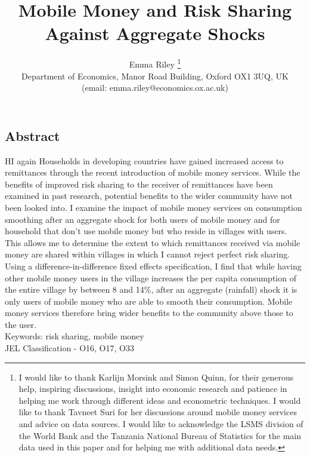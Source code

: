 \documentclass[a4paper]{article}
\begin{document}
\begin{titlepage}
\title{Mobile Money and Risk Sharing Against Aggregate Shocks}
\author{Emma Riley \footnote{I would like to thank  Karlijn Morsink and Simon Quinn, for their generous help, inspiring discussions, insight into economic research and patience in helping me work through different ideas and econometric techniques. I would like to thank Tavneet Suri for her discussions around mobile money services and advice on data sources. I would like to acknowledge the LSMS division of the World Bank and the Tanzania National Bureau of Statistics for the main data used in this paper and for helping me with additional data needs.} \\ Department of Economics, Manor Road Building, Oxford OX1 3UQ, UK \\ (email: emma.riley@economics.ox.ac.uk)}
\thispagestyle{empty}
\maketitle 
\begin{center}
\section*{Abstract}
\end{center}
HI again
Households in developing countries have gained increased access to remittances through the recent introduction of mobile money services. While the benefits of improved risk sharing to the receiver of remittances have been examined in past research, potential benefits to the wider community have not been looked into. I examine the impact of mobile money services on consumption smoothing after an aggregate shock for both users of mobile money and for household that don't use mobile money but who reside in villages with users. This allows me to determine the extent to which remittances received via mobile money are shared within villages in which I cannot reject perfect risk sharing. Using a difference-in-difference fixed effects specification, I find that while having other mobile money users in the village increases the per capita consumption of the entire village by between  8 and 14\%, after an aggregate (rainfall) shock it is only users of mobile money who are able to smooth their consumption. Mobile money services therefore bring wider benefits to the community above those to the user. \\

\noindent Keywords: risk sharing, mobile money \\
JEL Classification - O16, O17, O33
\thispagestyle{empty}



\end{titlepage}
\end{document}
